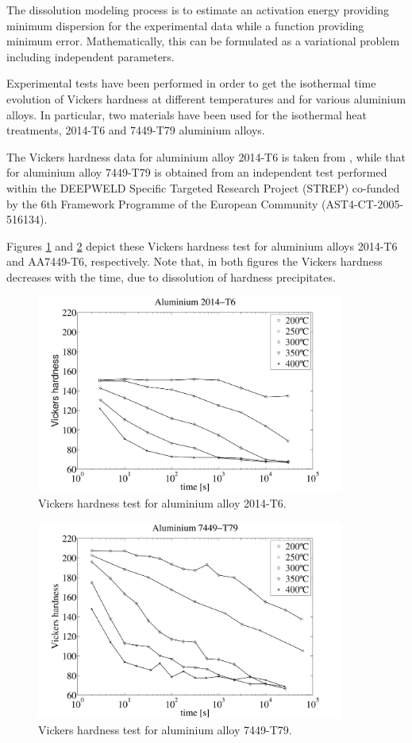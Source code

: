 The dissolution modeling process is to estimate an activation
energy providing minimum dispersion for the experimental data
while a function providing minimum error.
Mathematically, this can be formulated as a variational problem
including independent parameters.

Experimental tests have been performed in order to get the
isothermal time evolution of Vickers hardness at different
temperatures and for various aluminium alloys. In particular, two
materials have been used for the isothermal heat treatments, 2014-T6
and 7449-T79 aluminium alloys.

The Vickers hardness data for aluminium alloy 2014-T6 is taken from
\cite{Shercliff2005}, while that for aluminium alloy 7449-T79 is
obtained from an independent test performed within the DEEPWELD
Specific Targeted Research Project (STREP) co-funded by the 6th
Framework Programme of the European Community (AST4-CT-2005-516134).

Figures \ref{VickersHardnessTest2014-T6} and
\ref{VickersHardnessTest7449-T79} depict these Vickers hardness test
for aluminium alloys 2014-T6 and AA7449-T6, respectively. Note that,
in both figures the Vickers hardness decreases with the time, due to
dissolution of hardness precipitates.

\begin{figure}[h!]
\begin{center}
\includegraphics[width=0.9\textwidth]{inverse_problems/vickers_hardness_test_2014-T6}
\caption{Vickers hardness test for aluminium alloy
2014-T6.}\label{VickersHardnessTest2014-T6}
\end{center}
\end{figure}

\begin{figure}[h!]
\begin{center}
\includegraphics[width=0.9\textwidth]{inverse_problems/vickers_hardness_test_7449-T79}
\caption{Vickers hardness test for aluminium alloy
7449-T79.}\label{VickersHardnessTest7449-T79}
\end{center}
\end{figure}
